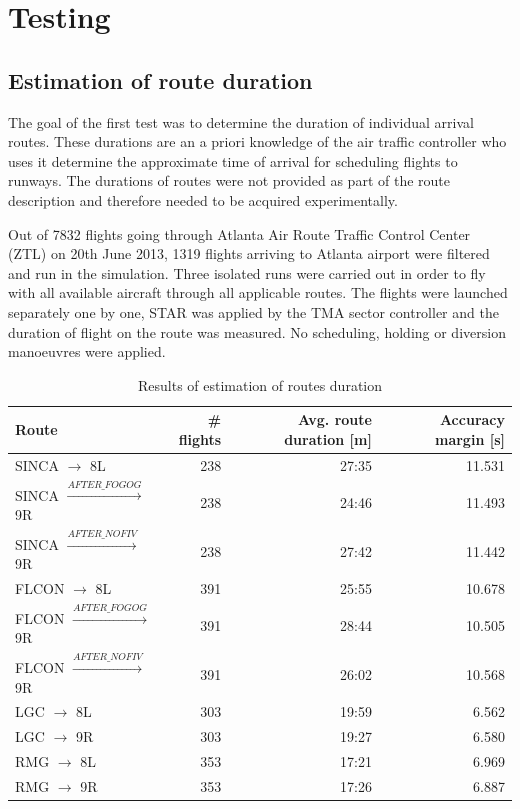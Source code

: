 \chapter{Testing}


\section{Estimation of route duration}

The goal of the first test was to determine the duration of individual arrival routes. These durations are an a priori knowledge of the air traffic controller who uses it determine the approximate time of arrival for scheduling flights to runways. The durations of routes were not provided as part of the route description and therefore needed to be acquired experimentally.

Out of 7832 flights going through Atlanta Air Route Traffic Control Center (ZTL) on 20th June 2013, 1319 flights arriving to Atlanta airport were filtered and run in the simulation. Three isolated runs were carried out in order to fly with all available aircraft through all applicable routes. The flights were launched separately one by one, STAR was applied by the TMA sector controller and the duration of flight on the route was measured. No scheduling, holding or diversion manoeuvres were applied.

\begin{table}[h]
  \centering
\begin{tabular}{ | l | r | r | r | }
\hline
Route   & \# flights & Avg. route duration [m]  & Accuracy margin [s] \\
\hline
SINCA $\rightarrow$ 8L                & 238 & 27:35 & 11.531  \\
SINCA $\xrightarrow{AFTER\_FOGOG}$ 9R & 238 & 24:46 & 11.493  \\
SINCA $\xrightarrow{AFTER\_NOFIV}$ 9R & 238 & 27:42 & 11.442  \\

FLCON $\rightarrow$ 8L                & 391 & 25:55 & 10.678  \\
FLCON $\xrightarrow{AFTER\_FOGOG}$ 9R & 391 & 28:44 & 10.505  \\
FLCON $\xrightarrow{AFTER\_NOFIV}$ 9R & 391 & 26:02 & 10.568  \\

LGC $\rightarrow$ 8L   & 303 & 19:59 & 6.562  \\
LGC $\rightarrow$ 9R   & 303 & 19:27 & 6.580  \\

RMG $\rightarrow$ 8L   & 353 & 17:21 & 6.969  \\
RMG $\rightarrow$ 9R   & 353 & 17:26 & 6.887  \\
\hline
\end{tabular}
  \caption{Results of estimation of routes duration}
  \label{tab:route_duration}
\end{table}

